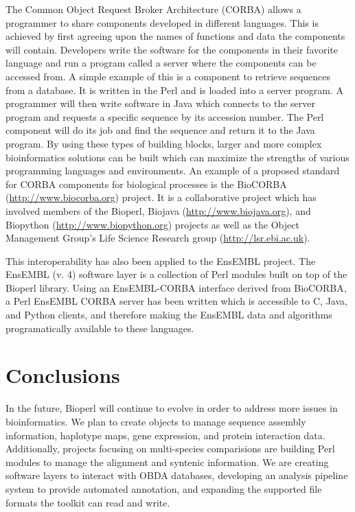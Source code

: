\documentclass[12pt]{article}
\begin{document}
The Common Object Request Broker Architecture (CORBA)
allows a programmer to share components developed in different
languages.  This is achieved by first agreeing upon the names of
functions and data the components will contain.  Developers write the
software for the components in their favorite language and run a
program called a server where the components can be accessed from.  A
simple example of this is a component to retrieve sequences from a
database.  It is written in the Perl and is loaded into a server
program.  A programmer will then write software in Java which connects
to the server program and requests a specific sequence by its
accession number.  The Perl component will do its job and find the
sequence and return it to the Java program.  By using these types of
building blocks, larger and more complex bioinformatics solutions can
be built which can maximize the strengths of various programming
languages and environments.  An example of a proposed standard for
CORBA components for biological processes is the BioCORBA
(\url{http://www.biocorba.org}) project.  It is a collaborative
project which has involved members of the Bioperl, Biojava
(\url{http://www.biojava.org}), and Biopython
(\url{http://www.biopython.org}) projects as well as the Object
Management Group's Life Science Research group
(\url{http://lsr.ebi.ac.uk}).

This interoperability has also been applied to the EnsEMBL project.
The EnsEMBL (v. 4) software layer is a collection of Perl modules
built on top of the Bioperl library.  Using an EnsEMBL-CORBA interface
derived from BioCORBA, a Perl EnsEMBL CORBA server has been written
which is accessible to C, Java, and Python clients, and therefore
making the EnsEMBL data and algorithms programatically available to
these languages.

\section{Conclusions}

In the future, Bioperl will continue to evolve in order to address
more issues in bioinformatics.  We plan to create objects to
manage sequence assembly information, haplotype maps, gene expression,
and protein interaction data.  Additionally, projects focusing on
multi-species comparisions are building Perl modules to manage the
alignment and syntenic information.  We are creating software layers
to interact with OBDA databases, developing an analysis pipeline
system to provide automated annotation, and expanding the supported
file formats the toolkit can read and write.
\end{document}
